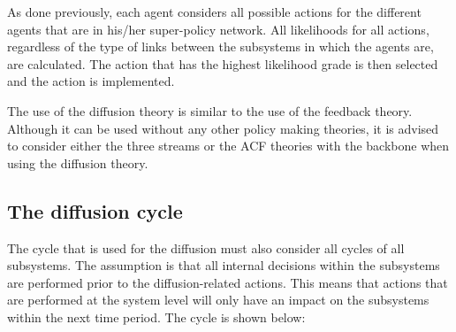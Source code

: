 As done previously, each agent considers all possible actions for the different agents that are in his/her super-policy network. All likelihoods for all actions, regardless of the type of links between the subsystems in which the agents are, are calculated. The action that has the highest likelihood grade is then selected and the action is implemented.

The use of the diffusion theory is similar to the use of the feedback theory. Although it can be used without any other policy making theories, it is advised to consider either the three streams or the ACF theories with the backbone when using the diffusion theory.

\subsection{The diffusion cycle}

The cycle that is used for the diffusion must also consider all cycles of all subsystems. The assumption is that all internal decisions within the subsystems are performed prior to the diffusion-related actions. This means that actions that are performed at the system level will only have an impact on the subsystems within the next time period. The cycle is shown below:

